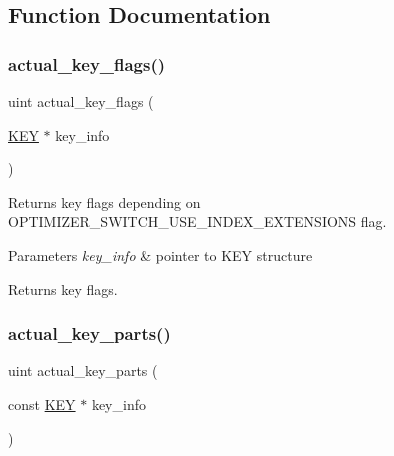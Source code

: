 \subsection{Function Documentation}
\mbox{\label{group__Query__Optimizer_ga174d79a5aef2a8abd1caec143b42837e}} 
\subsubsection{\texorpdfstring{actual\+\_\+key\+\_\+flags()}{actual\_key\_flags()}}
{\footnotesize\ttfamily uint actual\+\_\+key\+\_\+flags (\begin{DoxyParamCaption}\item[{\mbox{\hyperlink{structst__key}{K\+EY}} $\ast$}]{key\+\_\+info }\end{DoxyParamCaption})}

Returns key flags depending on O\+P\+T\+I\+M\+I\+Z\+E\+R\+\_\+\+S\+W\+I\+T\+C\+H\+\_\+\+U\+S\+E\+\_\+\+I\+N\+D\+E\+X\+\_\+\+E\+X\+T\+E\+N\+S\+I\+O\+NS flag.


\begin{DoxyParams}{Parameters}
{\em key\+\_\+info} & pointer to K\+EY structure\\
\hline
\end{DoxyParams}
\begin{DoxyReturn}{Returns}
key flags. 
\end{DoxyReturn}
\mbox{\label{group__Query__Optimizer_ga6609ac0420a8a415d5a57cc6659f460d}} 
\subsubsection{\texorpdfstring{actual\+\_\+key\+\_\+parts()}{actual\_key\_parts()}}
{\footnotesize\ttfamily uint actual\+\_\+key\+\_\+parts (\begin{DoxyParamCaption}\item[{const \mbox{\hyperlink{structst__key}{K\+EY}} $\ast$}]{key\+\_\+info }\end{DoxyParamCaption})}

